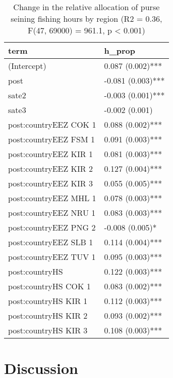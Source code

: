 \documentclass[11pt,]{article}
\begin{document}
\begin{table}[H]

\caption{\label{tab:unnamed-chunk-17}Change in the relative allocation of purse seining fishing hours by region (R2 = 0.36, F(47, 69000) = 961.1, p < 0.001)}
\centering
\begin{tabular}[t]{ll}
\toprule
term & h\_prop\\
\midrule
(Intercept) & 0.087 (0.002)***\\
post & -0.081 (0.003)***\\
sate2 & -0.003 (0.001)***\\
sate3 & -0.002 (0.001)\\
post:countryEEZ COK 1 & 0.088 (0.002)***\\
\addlinespace
post:countryEEZ FSM 1 & 0.091 (0.003)***\\
post:countryEEZ KIR 1 & 0.081 (0.003)***\\
post:countryEEZ KIR 2 & 0.127 (0.004)***\\
post:countryEEZ KIR 3 & 0.055 (0.005)***\\
post:countryEEZ MHL 1 & 0.078 (0.003)***\\
\addlinespace
post:countryEEZ NRU 1 & 0.083 (0.003)***\\
post:countryEEZ PNG 2 & -0.008 (0.005)*\\
post:countryEEZ SLB 1 & 0.114 (0.004)***\\
post:countryEEZ TUV 1 & 0.095 (0.003)***\\
post:countryHS & 0.122 (0.003)***\\
\addlinespace
post:countryHS COK 1 & 0.083 (0.002)***\\
post:countryHS KIR 1 & 0.112 (0.003)***\\
post:countryHS KIR 2 & 0.093 (0.002)***\\
post:countryHS KIR 3 & 0.108 (0.003)***\\
\bottomrule
\end{tabular}
\end{table}

\clearpage

\hypertarget{discussion}{%
\section{Discussion}\label{discussion}}
\end{document}
